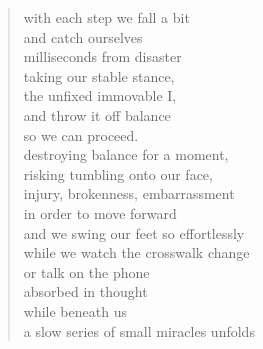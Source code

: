
\begin{verse}
with each step we fall a bit \\
and catch ourselves \\
milliseconds from disaster \\
taking our stable stance, \\
the unfixed immovable I, \\
and throw it off balance \\
so we can proceed. \\
destroying balance for a moment, \\
risking tumbling onto our face, \\
injury, brokenness, embarrassment \\
in order to move forward \\
and we swing our feet so effortlessly \\
while we watch the crosswalk change \\
or talk on the phone \\
absorbed in thought \\
while beneath us \\
a slow series of small miracles unfolds
\end{verse}
